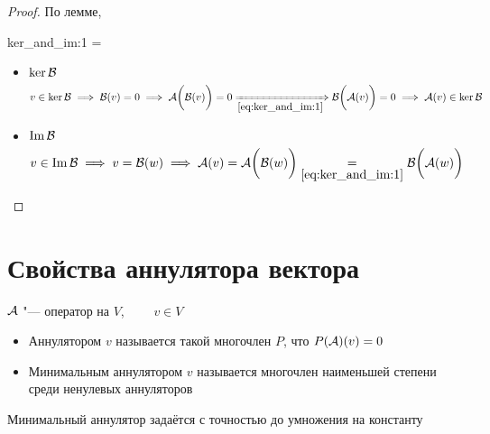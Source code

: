 \begin{proof}
	По лемме,
	\begin{equ}{ker_and_im:1}
		 \circ \mc{B} =  \circ {}
	\end{equ}
	\begin{itemize}
		\item $ \ker \mathcal{B} $
		$$ v \in \ker \mc{B} \implies \mc{B}(v) = 0 \implies \mc{A} \bigg( \mc{B}(v) \bigg) = 0 \underimp{\eref{ker_and_im:1}} \mc{B} \bigg( \mc{A}(v) \bigg) = 0 \implies \mc{A}(v) \in \ker \mc{B} $$
		\item $ \operatorname{Im} \mathcal{B} $
		$$ v \in \Img \mc{B} \implies v = \mc{B}(w) \implies \mc{A}(v) = \mc{A} \bigg( \mc{B}(w) \bigg) \underset{\eref{ker_and_im:1}}= \mc{B} \bigg( \mc{A}(w) \bigg) $$
	\end{itemize}
\end{proof}

\section{Свойства аннулятора вектора}

\begin{definition}
	$ \mathcal{A} $ "--- оператор на $ V $, $ \qquad v \in V $
	\begin{itemize}
		\item Аннулятором $ v $ называется такой многочлен $ P $, что $ P(\mathcal{A})(v) = 0 $
		\item Минимальным аннулятором $ v $ называется многочлен наименьшей степени среди ненулевых аннуляторов
	\end{itemize}
\end{definition}

\begin{remark}
	Минимальный аннулятор задаётся с точностью до умножения на константу
\end{remark}

